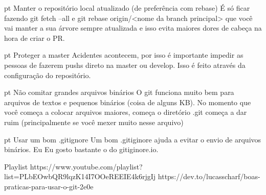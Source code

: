 pt Manter o repositório local atualizado (de preferência com rebase) É só ficar fazendo git fetch --all e git rebase origin/<nome da branch principal> que você vai manter a sua árvore sempre atualizada e isso evita maiores dores de cabeça na hora de criar o PR.

pt Proteger a master Acidentes acontecem, por isso é importante impedir as pessoas de fazerem pushs direto na master ou develop. Isso é feito através da configuração do repositório.

pt Não comitar grandes arquivos binários O git funciona muito bem para arquivos de textos e pequenos binários (coisa de alguns KB). No momento que você começa a colocar arquivos maiores, começa o diretório .git começa a dar ruim (principalmente se você mexer muito nesse arquivo)

pt Usar um bom .gitignore Um bom .gitiginore ajuda a evitar o envio de arquivos binários. Eu Eu gosto bastante o do gitiginore.io.

Playlist
https://www.youtube.com/playlist?list=PLbEOwbQR9lqzK14I7OOeREEIE4k6rjgIj
https://dev.to/lucasscharf/boas-praticas-para-usar-o-git-2e0e
